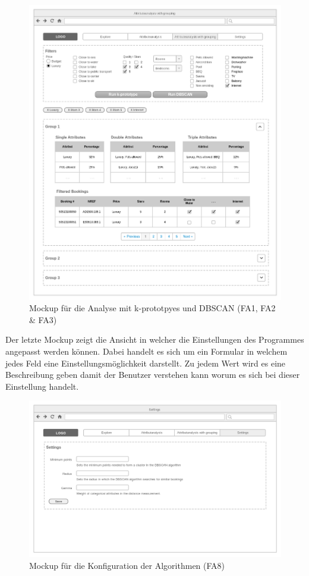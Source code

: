 \begin{figure}[H]
	\RawFloats
	\centering
	\includegraphics[width=1\textwidth]{images/wireframe-clustering}
	\caption{Mockup für die Analyse mit k-prototpyes und DBSCAN (FA1, FA2 \& FA3)}
	\label{fig:konzept:mockups:clustering}
\end{figure}

Der letzte Mockup zeigt die Ansicht in welcher die Einstellungen des Programmes angepasst werden können. Dabei handelt es sich um ein Formular in welchem jedes Feld eine Einstellungsmöglichkeit darstellt. Zu jedem Wert wird es eine Beschreibung geben damit der Benutzer verstehen kann worum es sich bei dieser Einstellung handelt.

\begin{figure}[H]
	\RawFloats
	\centering
	\includegraphics[width=1\textwidth]{images/wireframe-settings}
	\caption{Mockup für die Konfiguration der Algorithmen (FA8)}
	\label{fig:konzept:mockups:settings}
\end{figure}

